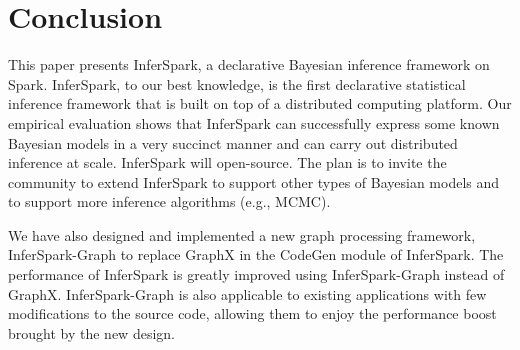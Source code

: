 
\chapter{Conclusion}
\label{chap:conclusion}

This paper presents InferSpark, 
a declarative Bayesian inference framework on Spark.
InferSpark, to our best knowledge, is the first declarative 
statistical inference framework
that is built on top of a distributed computing platform.
Our empirical evaluation shows that InferSpark can successfully express 
some known Bayesian models in a very succinct manner
and can carry out distributed inference at scale.
InferSpark will open-source.  
The plan is to invite the community to extend InferSpark to 
support other types of Bayesian models 
and to support more inference algorithms (e.g., MCMC).

We have also designed and implemented a new graph processing framework,
InferSpark-Graph to replace GraphX in the CodeGen module of InferSpark.
The performance of InferSpark is greatly improved using
InferSpark-Graph instead of GraphX. InferSpark-Graph is also applicable to
existing applications with few modifications to the source code, allowing them
to enjoy the performance boost brought by the new design.
